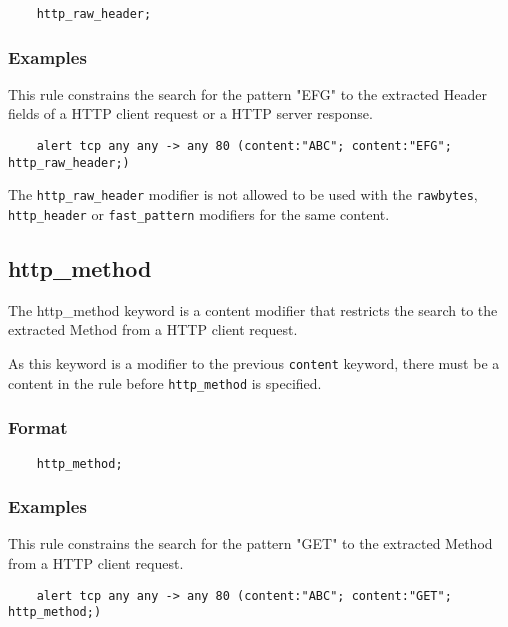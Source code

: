 \documentclass[english]{report}
\newenvironment{note}{
\samepage
    \vspace{10pt}{\textsf{
        {\hspace{7pt}\Huge{$\triangle$\hspace{-12.5pt}{\Large{$^!$}}}}\hspace{5pt}
        {\Large{NOTE}}
    }
    }
   \begin{center}
    \par\vspace{-17pt}

    \begin{lrbox}{\savepar}
    \begin{minipage}[r]{6in}
}
{
    \end{minipage}
    \end{lrbox}
    \fbox{
        \usebox{
            \savepar
	}
    }
    \par\vskip10pt
    \end{center}
}
\newenvironment{note}{
        \begin{rawhtml}
        <p><table border="1"><tr><td><b>
        Note:&nbsp;&nbsp;</b>
        \end{rawhtml}
}{
        \begin{rawhtml}
        </b></td></tr></table></p>
        \end{rawhtml}
}
\begin{document}
\begin{verbatim}
    http_raw_header;
\end{verbatim}

\subsubsection{Examples}

This rule constrains the search for the pattern "EFG" to the extracted Header fields
of a HTTP client request or a HTTP server response.

\begin{verbatim}
    alert tcp any any -> any 80 (content:"ABC"; content:"EFG"; http_raw_header;)
\end{verbatim}

\begin{note}

The \texttt{http\_raw\_header} modifier is not allowed to be used with the
\texttt{rawbytes}, \texttt{http\_header} or \texttt{fast\_pattern} modifiers for the same
content.

\end{note}

\subsection{http\_method}
\label{sub:HttpMethod}

The http\_method keyword is a content modifier that restricts the search to the
extracted Method from a HTTP client request.

As this keyword is a modifier to the previous \texttt{content} keyword, there must be
a content in the rule before \texttt{http\_method} is specified.

\subsubsection{Format}

\begin{verbatim}
    http_method;
\end{verbatim}

\subsubsection{Examples}

This rule constrains the search for the pattern "GET" to the extracted Method
from a HTTP client request.

\begin{verbatim}
    alert tcp any any -> any 80 (content:"ABC"; content:"GET"; http_method;)
\end{verbatim}
\end{document}
